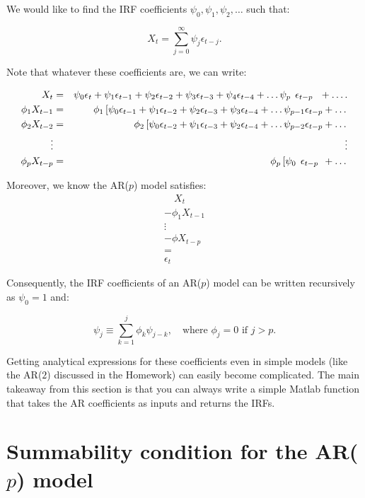 \documentclass[12] {article}
\begin{document}
We would like to find the IRF coefficients $\psi_0, \psi_1, \psi_2, \ldots $ such that:

\[ X_t = \sum_{j=0}^{\infty} \psi_j \epsilon_{t-j}.\]
 
\noindent Note that whatever these coefficients are, we can write:
 
 \begin{eqnarray*}
 X_t &=& \psi_0 \epsilon_{t} + \psi_1 \epsilon_{t-1} + \psi_{2} \epsilon_{t-2} +  \psi_3 \epsilon_{t-3} +  \psi_4 \epsilon_{t-4} + \ldots \psi_{p} \: \: \epsilon_{t-p} \: \: \: + \ldots. \\
 \phi_1 X_{t-1} &= &  \quad \: \:  \phi_1 \left[ \psi_0 \epsilon_{t-1} + \psi_1 \epsilon_{t-2} + \psi_{2} \epsilon_{t-3} +  \psi_3 \epsilon_{t-4} + \ldots  \psi_{p-1} \epsilon_{t-p} + \ldots \right. \\
 \phi_2 X_{t-2} &= &  \quad \quad \quad \quad \quad \: \:  \phi_2 \left[ \psi_0 \epsilon_{t-2} + \psi_1 \epsilon_{t-3} + \psi_{2} \epsilon_{t-4} +  \ldots  \psi_{p-2} \epsilon_{t-p} + \ldots \right. \\
 \vdots && \vdots \\
  \phi_p X_{t-p} &= &  \hspace{6.7cm} \: \:  \phi_p \left[ \psi_0 \: \: \epsilon_{t-p} \: \:+ \ldots \right. \\
 \end{eqnarray*}
 
Moreover, we know the AR($p$) model satisfies:
\begin{eqnarray*}
& \quad X_t & \\
&-\phi_1 X_{t-1}&\\
& \vdots & \\
&-\phi X_{t-p}&\\
&=& \\
&\epsilon_{t}&
\end{eqnarray*}  

Consequently, the IRF coefficients of an AR($p$) model can be written recursively as $\psi_0=1$ and:

\[ \psi_j \equiv \sum_{k=1}^{j} \phi_k \psi_{j-k}, \quad \textrm{where } \phi_j= 0 \textrm{ if } j>p. \]

Getting analytical expressions for these coefficients even in simple models (like the AR($2$) discussed in the Homework) can easily become complicated. The main takeaway from this section is that you can always write a simple Matlab function that takes the AR coefficients as inputs and returns the IRFs. 


\section{Summability condition for the AR($p$) model}
\end{document}
